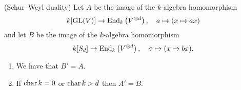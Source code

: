 \begin{theorem}(Schur--Weyl duality)
  \label{theorem: schur weyl duality}
  Let $A$ be the image of the $k$-algebra homomorphism
  \[
            k[\operatorname{GL}(V)]
    \to     \operatorname{End}_k\left( V^{\mathbin{\otimes} d} \right),
    \quad   a
    \mapsto (x \mapsto ax)
  \]
  and let $B$ be the image of the $k$-algebra homomorphism
  \[
            k[S_d]
    \to     \operatorname{End}_k\left( V^{\mathbin{\otimes} d} \right),
    \quad   \sigma
    \mapsto (x \mapsto bx).
  \]
  \begin{enumerate}
    \item \label{enum: end gl = sd}
      We have that $B' = A$.
    \item \label{enum: end sd = gl}
      If $\operatorname{char} k = 0$ or $\operatorname{char} k > d$ then $A' = B$.
  \end{enumerate}
\end{theorem}


